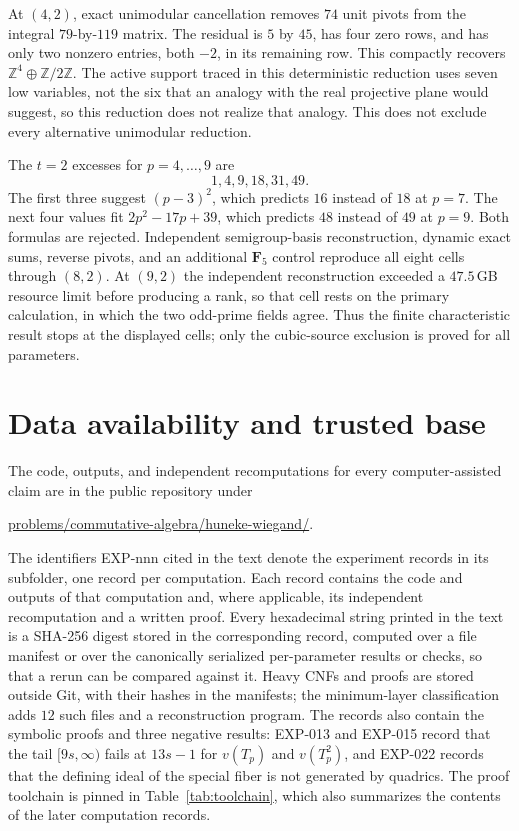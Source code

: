 \documentclass[11pt]{article}
\theoremstyle{definition}
\theoremstyle{remark}
\begin{document}
At $(4,2)$, exact unimodular cancellation removes $74$ unit pivots from the integral
$79$-by-$119$ matrix. The residual is $5$ by $45$, has four zero rows, and has only two nonzero
entries, both $-2$, in its remaining row. This compactly recovers
$\mathbb Z^4\oplus\mathbb Z/2\mathbb Z$. The active support traced in this deterministic reduction
uses seven low variables, not the six that an analogy with the real projective plane would
suggest, so this reduction does not realize that analogy. This does not exclude every alternative
unimodular reduction.

The $t=2$ excesses for $p=4,\ldots,9$ are
\[
1,4,9,18,31,49.
\]
The first three suggest $(p-3)^2$, which predicts $16$ instead of $18$ at $p=7$. The next four
values fit $2p^2-17p+39$, which predicts $48$ instead of $49$ at $p=9$. Both formulas are rejected.
Independent semigroup-basis reconstruction, dynamic exact sums, reverse pivots, and an additional
$\mathbf F_5$ control reproduce all eight cells through $(8,2)$. At $(9,2)$ the independent
reconstruction exceeded a $47.5$\,GB resource limit before producing a rank, so that cell rests on
the primary calculation, in which the two odd-prime fields agree. Thus the finite characteristic
result stops at the displayed cells; only the cubic-source exclusion is proved for all parameters.

\section{\texorpdfstring{\enspace}{}Data availability and trusted base}

The code, outputs, and independent recomputations for every computer-assisted claim are in the
public repository under
\begin{center}
\url{problems/commutative-algebra/huneke-wiegand/}.
\end{center}
The identifiers EXP-nnn cited in the text denote the experiment records in its
 subfolder, one record per computation. Each record contains the code and
outputs of that computation and, where applicable, its independent recomputation and a written
proof. Every
hexadecimal string printed in the text is a SHA-256 digest stored in the corresponding record,
computed over a file manifest or over the canonically serialized per-parameter results or checks,
so that a rerun can be compared against it. Heavy CNFs and proofs are stored outside Git, with
their hashes in the manifests; the minimum-layer classification adds $12$ such files and a
reconstruction program. The records also contain the symbolic proofs and three negative results:
EXP-013 and EXP-015 record that the tail $[9s,\infty)$ fails at $13s-1$ for $v(T_p)$ and
$v(T_p^2)$, and EXP-022 records that the defining ideal of the special fiber is not generated by
quadrics. The proof toolchain is pinned in Table~\ref{tab:toolchain}, which also summarizes the
contents of the later computation records.
\end{document}
